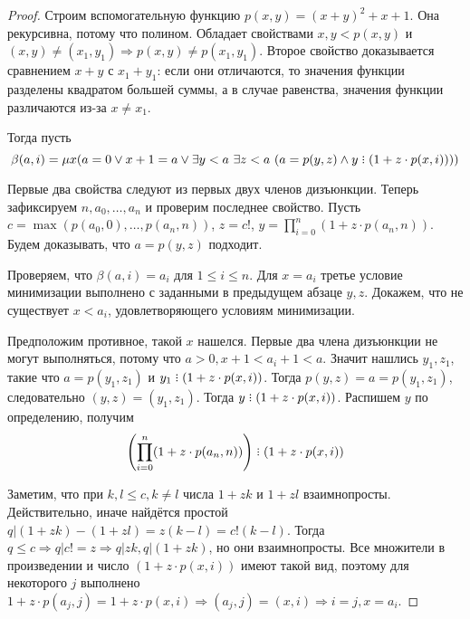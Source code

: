 \begin{proof}
    Строим вспомогательную функцию $p(x, y) = (x+y)^2+x+1$. Она рекурсивна, потому что полином. Обладает свойствами $x, y < p(x, y)$ и $(x, y)\ne (x_1, y_1) \Rightarrow p(x, y)\ne p(x_1, y_1)$. Второе свойство доказывается сравнением $x+y$ с $x_1+y_1$: если они отличаются, то значения функции разделены квадратом большей суммы, а в случае равенства, значения функции различаются из-за $x\ne x_1$.

    Тогда пусть $$\beta(a, i)=\mu x (a=0\vee x+1=a \vee \exists y<a~ \exists z<a~(a=p(y, z)\wedge y\divby(1+z\cdot p(x, i))))$$

    Первые два свойства следуют из первых двух членов дизъюнкции. Теперь зафиксируем $n, a_0, \ldots, a_n$ и проверим последнее свойство.
    Пусть $c = \max(p(a_0, 0), \ldots, p(a_n, n))$, $z = c!$, $y = \prod_{i=0}^n(1+z\cdot p(a_n, n))$. Будем доказывать, что $a = p(y, z)$ подходит.

    Проверяем, что $\beta(a, i)=a_i$ для $1\le i\le n$.  Для $x=a_i$ третье условие минимизации выполнено с заданными в предыдущем абзаце $y, z$. Докажем, что не существует $x<a_i$, удовлетворяющего условиям минимизации.

    Предположим противное, такой $x$ нашелся. Первые два члена дизъюнкции не могут выполняться, потому что $a>0, x+1<a_i+1<a$. Значит нашлись $y_1, z_1$, такие что $a = p(y_1, z_1)$ и $y_1 \divby (1+z\cdot p(x, i))$. Тогда $p(y, z) = a = p(y_1, z_1)$, следовательно $(y, z)=(y_1, z_1)$. Тогда $y\divby (1+z\cdot p(x, i))$. Распишем $y$ по определению, получим $$\left(\prod_{i=0}^n(1+z\cdot p(a_n, n))\right) \divby (1+z\cdot p(x, i))$$

    Заметим, что при $k, l\le c, k\ne l$ числа $1+zk$ и $1+zl$ взаимнопросты. Действительно, иначе найдётся простой $q | (1+zk)-(1+zl) = z(k-l) = c!(k-l)$. Тогда $q\le c \Rightarrow q | c!=z \Rightarrow q | zk, q|(1+zk)$, но они взаимнопросты. Все множители в произведении и число $(1+z\cdot p(x, i))$ имеют такой вид, поэтому для некоторого $j$ выполнено $1+z\cdot p(a_j, j)=1+z\cdot p(x, i)\Rightarrow (a_j, j)=(x, i)\Rightarrow i=j, x = a_i$.


\end{proof}
